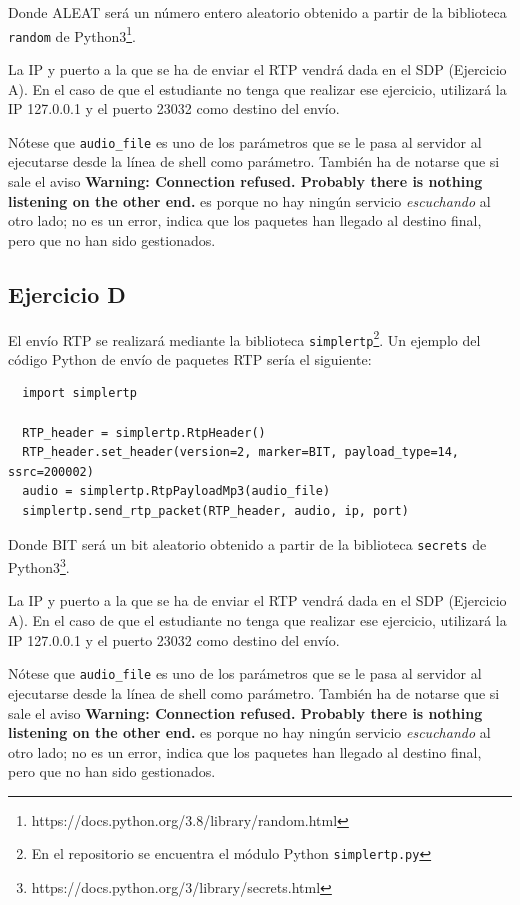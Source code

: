 \documentclass[a4paper,11pt]{article}
\begin{document}
Donde ALEAT será un número entero aleatorio obtenido a partir de la biblioteca \texttt{random} de Python3\footnote{https://docs.python.org/3.8/library/random.html}.

La IP y puerto a la que se ha de enviar el RTP vendrá dada en el SDP (Ejercicio A). En el caso de que el estudiante no tenga que realizar ese ejercicio, utilizará la IP 127.0.0.1 y el puerto 23032 como destino del envío.

Nótese que \texttt{audio\_file} es uno de los parámetros que se le pasa al servidor al ejecutarse desde la línea de shell como parámetro. También ha de notarse que si sale el aviso {\bf Warning: Connection refused. Probably there is nothing listening on the other end.} es porque no hay ningún servicio \emph{escuchando} al otro lado; no es un error, indica que los paquetes han llegado al destino final, pero que no han sido gestionados.

\subsection*{Ejercicio D}

El envío RTP se realizará mediante la biblioteca \texttt{simplertp}\footnote{En el repositorio se encuentra el módulo Python \texttt{simplertp.py}}. Un ejemplo del código Python de envío de paquetes RTP sería el siguiente:

\begin{verbatim}
  import simplertp

  RTP_header = simplertp.RtpHeader()
  RTP_header.set_header(version=2, marker=BIT, payload_type=14, ssrc=200002)
  audio = simplertp.RtpPayloadMp3(audio_file)
  simplertp.send_rtp_packet(RTP_header, audio, ip, port)
\end{verbatim}

Donde BIT será un bit aleatorio obtenido a partir de la biblioteca \texttt{secrets} de Python3\footnote{https://docs.python.org/3/library/secrets.html}.

La IP y puerto a la que se ha de enviar el RTP vendrá dada en el SDP (Ejercicio A). En el caso de que el estudiante no tenga que realizar ese ejercicio, utilizará la IP 127.0.0.1 y el puerto 23032 como destino del envío.

Nótese que \texttt{audio\_file} es uno de los parámetros que se le pasa al servidor al ejecutarse desde la línea de shell como parámetro. También ha de notarse que si sale el aviso {\bf Warning: Connection refused. Probably there is nothing listening on the other end.} es porque no hay ningún servicio \emph{escuchando} al otro lado; no es un error, indica que los paquetes han llegado al destino final, pero que no han sido gestionados.
\end{document}
